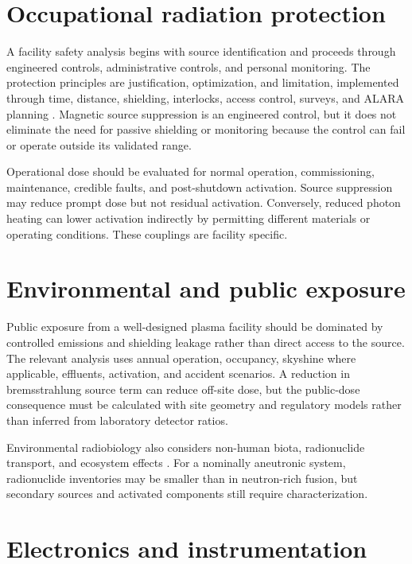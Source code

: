 \section{Occupational radiation protection}

A facility safety analysis begins with source identification and proceeds through engineered controls, administrative controls, and personal monitoring. The protection principles are justification, optimization, and limitation, implemented through time, distance, shielding, interlocks, access control, surveys, and ALARA planning \cite{icrp103,iaeaGSR3}. Magnetic source suppression is an engineered control, but it does not eliminate the need for passive shielding or monitoring because the control can fail or operate outside its validated range.

Operational dose should be evaluated for normal operation, commissioning, maintenance, credible faults, and post-shutdown activation. Source suppression may reduce prompt dose but not residual activation. Conversely, reduced photon heating can lower activation indirectly by permitting different materials or operating conditions. These couplings are facility specific.

\section{Environmental and public exposure}

Public exposure from a well-designed plasma facility should be dominated by controlled emissions and shielding leakage rather than direct access to the source. The relevant analysis uses annual operation, occupancy, skyshine where applicable, effluents, activation, and accident scenarios. A reduction in bremsstrahlung source term can reduce off-site dose, but the public-dose consequence must be calculated with site geometry and regulatory models rather than inferred from laboratory detector ratios.

Environmental radiobiology also considers non-human biota, radionuclide transport, and ecosystem effects \cite{baatout2023,unscear2020}. For a nominally aneutronic system, radionuclide inventories may be smaller than in neutron-rich fusion, but secondary sources and activated components still require characterization.

\section{Electronics and instrumentation}

